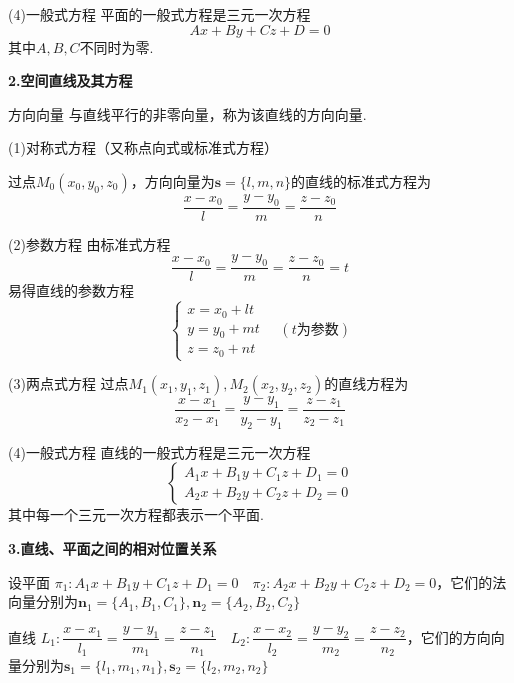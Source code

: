 (4)一般式方程 \quad 平面的一般式方程是三元一次方程
\begin{equation}
    Ax+By+Cz+D=0
    \nonumber
\end{equation}
其中$A,B,C$不同时为零.

\textbf{2.空间直线及其方程}

方向向量 \quad 与直线平行的非零向量，称为该直线的方向向量.

(1)对称式方程（又称点向式或标准式方程）

过点$M_0(x_0,y_0,z_0)$，方向向量为$\bm{s}=\{l,m,n\}$的直线的标准式方程为
\begin{equation}
    \frac{x-x_0}{l}=\frac{y-y_0}{m}=\frac{z-z_0}{n}
    \nonumber
\end{equation}

(2)参数方程 \quad 由标准式方程
\begin{equation}
    \frac{x-x_0}{l}=\frac{y-y_0}{m}=\frac{z-z_0}{n}=t
    \nonumber
\end{equation}
易得直线的参数方程
\begin{equation}
    \begin{cases}
    x=x_0+lt \\
    y=y_0+mt \\
    z=z_0+nt
    \end{cases}
    \quad (t\mbox{为参数})
    \nonumber
\end{equation}

(3)两点式方程 \quad 过点$M_1(x_1,y_1,z_1),M_2(x_2,y_2,z_2)$的直线方程为
\begin{equation}
    \frac{x-x_1}{x_2-x_1}=\frac{y-y_1}{y_2-y_1}=\frac{z-z_1}{z_2-z_1}
    \nonumber
\end{equation}

(4)一般式方程 \quad 直线的一般式方程是三元一次方程
\begin{equation}
    \begin{cases}
    A_1x+B_1y+C_1z+D_1=0 \\
    A_2x+B_2y+C_2z+D_2=0
    \end{cases}
    \nonumber
\end{equation}
其中每一个三元一次方程都表示一个平面.

\textbf{3.直线、平面之间的相对位置关系}

设平面 \quad $\pi_1:A_1x+B_1y+C_1z+D_1=0 \quad \pi_2:A_2x+B_2y+C_2z+D_2=0$，它们的法向量分别为$\bm{n}_1=\{A_1,B_1,C_1\},\bm{n}_2=\{A_2,B_2,C_2\}$

直线 \quad $L_1:\dfrac{x-x_1}{l_1}=\dfrac{y-y_1}{m_1}=\dfrac{z-z_1}{n_1} \quad L_2:\dfrac{x-x_2}{l_2}=\dfrac{y-y_2}{m_2}=\dfrac{z-z_2}{n_2}$，它们的方向向量分别为$\bm{s}_1=\{l_1,m_1,n_1\},\bm{s}_2=\{l_2,m_2,n_2\}$

